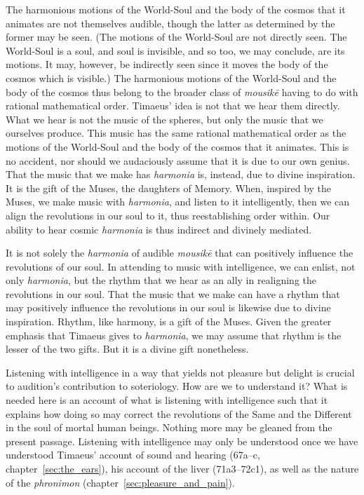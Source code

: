 The harmonious motions of the World-Soul and the body of the cosmos that it animates are not themselves audible, though the latter as determined by the former may be seen. (The motions of the World-Soul are not directly seen. The World-Soul is a soul, and soul is invisible, and so too, we may conclude, are its motions. It may, however, be indirectly seen since it moves the body of the cosmos which is visible.) The harmonious motions of the World-Soul and the body of the cosmos thus belong to the broader class of \emph{mousikē} having to do with rational mathematical order. Timaeus' idea is not that we hear them directly. What we hear is not the music of the spheres, but only the music that we ourselves produce. This music has the same rational mathematical order as the motions of the World-Soul and the body of the cosmos that it animates. This is no accident, nor should we audaciously assume that it is due to our own genius. That the music that we make has \emph{harmonia} is, instead, due to divine inspiration. It is the gift of the Muses, the daughters of Memory. When, inspired by the Muses, we make music with \emph{harmonia}, and listen to it intelligently, then we can align the revolutions in our soul to it, thus reestablishing order within. Our ability to hear cosmic \emph{harmonia} is thus indirect and divinely mediated.

It is not solely the \emph{harmonia} of audible \emph{mousikē} that can positively influence the revolutions of our soul. In attending to music with intelligence, we can enlist, not only \emph{harmonia}, but the rhythm that we hear as an ally in realigning the revolutions in our soul. That the music that we make can have a rhythm that may positively influence the revolutions in our soul is likewise due to divine inspiration. Rhythm, like harmony, is a gift of the Muses. Given the greater emphasis that Timaeus gives to \emph{harmonia}, we may assume that rhythm is the lesser of the two gifts. But it is a divine gift nonetheless.

Listening with intelligence in a way that yields not pleasure but delight is crucial to audition's contribution to soteriology. How are we to understand it? What is needed here is an account of what is listening with intelligence such that it explains how doing so may correct the revolutions of the Same and the Different in the soul of mortal human beings. Nothing more may be gleaned from the present passage. Listening with intelligence may only be understood once we have understood Timaeus' account of sound and hearing (67a–c, chapter~\ref{sec:the_ears}), his account of the liver (71a3–72c1), as well as the nature of the \emph{phronimon} (chapter~\ref{sec:pleasure_and_pain}).

